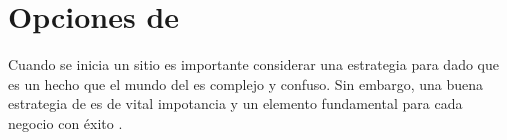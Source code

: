 
\section{ Opciones de \shipping}
Cuando se inicia un sitio \ecommerceCOM es importante considerar una estrategia para \shipping dado que es un hecho que el mundo del \shipping es complejo y confuso. Sin embargo, una buena estrategia de \shipping es de vital impotancia y un elemento fundamental para cada negocio \ecommerceCOM con éxito \cite{online_shopify_shipping_toolbox}.

